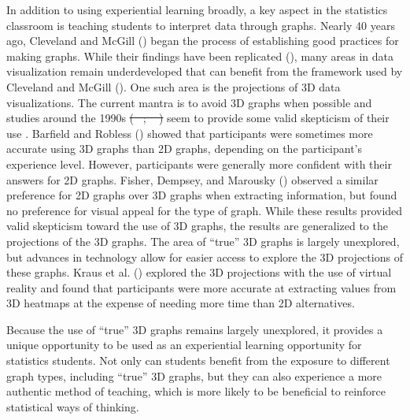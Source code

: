 \documentclass[
  12pt,
]{article}
\providecommand{\DIFadd}[1]{{\protect\color{blue}\uwave{#1}}} %
\providecommand{\DIFdel}[1]{{\protect\color{red}\sout{#1}}}                      %
\providecommand{\DIFaddbegin}{} %
\providecommand{\DIFaddend}{} %
\providecommand{\DIFdelbegin}{} %
\providecommand{\DIFdelend}{} %
\newcommand{\DIFscaledelfig}{0.5}
\newlength{\DIFdelgraphicswidth} %
\newlength{\DIFdelgraphicsheight} %
\newcommand{\DIFaddincludegraphics}[2][]{{\color{blue}\fbox{\DIFOincludegraphics[#1]{#2}}}} %
\newcommand{\DIFdelincludegraphics}[2][]{%
\sbox{\DIFdelgraphicsbox}{\DIFOincludegraphics[#1]{#2}}%
\settoboxwidth{\DIFdelgraphicswidth}{\DIFdelgraphicsbox} %
\settoboxtotalheight{\DIFdelgraphicsheight}{\DIFdelgraphicsbox} %
\scalebox{\DIFscaledelfig}{%
\parbox[b]{\DIFdelgraphicswidth}{\usebox{\DIFdelgraphicsbox}\\[-\baselineskip] \rule{\DIFdelgraphicswidth}{0em}}\llap{\resizebox{\DIFdelgraphicswidth}{\DIFdelgraphicsheight}{%
\setlength{\unitlength}{\DIFdelgraphicswidth}%
\begin{picture}(1,1)%
\thicklines\linethickness{2pt} %
{\color[rgb]{1,0,0}\put(0,0){\framebox(1,1){}}}%
{\color[rgb]{1,0,0}\put(0,0){\line( 1,1){1}}}%
{\color[rgb]{1,0,0}\put(0,1){\line(1,-1){1}}}%
\end{picture}%
}\hspace*{3pt}}} %
} %
\DeclareRobustCommand{\DIFaddbegin}{\DIFOaddbegin \let\includegraphics\DIFaddincludegraphics} %
\DeclareRobustCommand{\DIFaddend}{\DIFOaddend \let\includegraphics\DIFOincludegraphics} %
\DeclareRobustCommand{\DIFdelbegin}{\DIFOdelbegin \let\includegraphics\DIFdelincludegraphics} %
\DeclareRobustCommand{\DIFdelend}{\DIFOaddend \let\includegraphics\DIFOincludegraphics} %
\begin{document}
In addition to using experiential learning broadly, a key aspect in the
statistics classroom is teaching students to interpret data through
graphs. Nearly 40 years ago, Cleveland and McGill
() began the process of establishing
good practices for making graphs. While their findings have been
replicated (), many areas
in data visualization remain underdeveloped that can benefit from the
framework used by Cleveland and McGill
(). One such area is the projections
of 3D data visualizations. The current mantra is to avoid 3D graphs when
possible and studies around the 1990s \DIFdelbegin \DIFdel{(\mbox{%
\citeproc{ref-barfield1989}{Barfield and Robless 1989}}\hskip0pt%
;
\mbox{%
\citeproc{ref-fisher1997}{Fisher, Dempsey, and Marousky 1997}}\hskip0pt%
) }\DIFdelend seem to provide some valid
skepticism of their use \DIFaddbegin \DIFadd{(\mbox{%
\citeproc{ref-barfield1989}{Barfield and
Robless 1989}}\hskip0pt%
; \mbox{%
\citeproc{ref-fisher1997}{Fisher, Dempsey, and Marousky
1997}}\hskip0pt%
)}\DIFaddend . Barfield and Robless () showed
that participants were sometimes more accurate using 3D graphs than 2D
graphs, depending on the participant's experience level. However,
participants were generally more confident with their answers for 2D
graphs. Fisher, Dempsey, and Marousky ()
observed a similar preference for 2D graphs over 3D graphs when
extracting information, but found no preference for visual appeal for
the type of graph. While these results provided valid skepticism toward
the use of 3D graphs, the results are generalized to the projections of
the 3D graphs. The area of ``true'' 3D graphs is largely unexplored, but
advances in technology allow for easier access to explore the 3D
projections of these graphs. Kraus et al.
() explored the 3D projections with the
use of virtual reality and found that participants were more accurate at
extracting values from 3D heatmaps at the expense of needing more time
than 2D alternatives.

Because the use of ``true'' 3D graphs remains largely unexplored, it
provides a unique opportunity to be used as an experiential learning
opportunity for statistics students. Not only can students benefit from
the exposure to different graph types, including ``true'' 3D graphs, but
they can also experience a more authentic method of teaching, which is
more likely to be beneficial to reinforce statistical ways of thinking.
\end{document}
